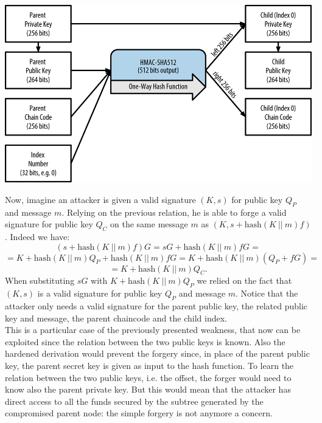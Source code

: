 \begin{center}
	\includegraphics[scale = 0.4]{Images/bip32.png}
	\label{fig:bip32}
\end{center}
Now, imagine an attacker is given a valid signature $(K, s)$ for public key $Q_P$ and message $m$. Relying on the previous relation, he is able to forge a valid signature for public key $Q_C$ on the same message $m$ as $(K, s + \text{hash}(K \ || \ m)f)$. Indeed we have:
$$(s + \text{hash}(K \ || \ m)f)G = sG + \text{hash}(K \ || \ m)fG = $$
$$= K + \text{hash}(K \ || \ m)Q_P + \text{hash}(K \ || \ m)fG = K + \text{hash}(K \ || \ m)(Q_P + fG) = $$
$$ = K + \text{hash}(K \ || \ m)Q_C.$$
When substituting $sG$ with $K + \text{hash}(K \ || \ m)Q_P$ we relied on the fact that $(K, s)$ is a valid signature for public key $Q_P$ and message $m$. Notice that the attacker only needs a valid signature for the parent public key, the related public key and message, the parent chaincode and the child index.
\\
This is a particular case of the previously presented weakness, that now can be exploited since the relation between the two public keys is known. Also the hardened derivation would prevent the forgery since, in place of the parent public key, the parent secret key is given as input to the hash function. To learn the relation between the two public keys, i.e. the offset, the forger would need to know also the parent private key. But this would mean that the attacker has direct access to all the funds secured by the subtree generated by the compromised parent node: the simple forgery is not anymore a concern.

